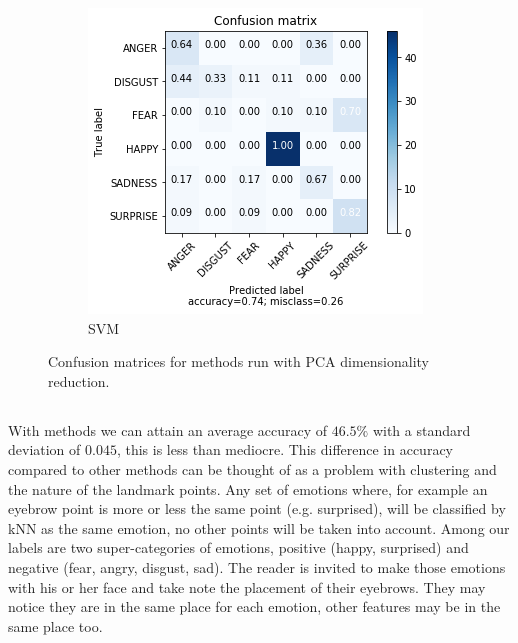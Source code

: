 \begin{figure}
    \begin{subfigure}[b]{0.24\textwidth}
        \includegraphics[width=\textwidth]{figures/pca-svm.png}
        \caption{SVM}
        \label{fig:pca-svm}
    \end{subfigure}
    \caption{Confusion matrices for methods run with PCA dimensionality reduction.}\label{fig:results}
\end{figure}

\subsection{\knn}

With \knn methods we can attain an average accuracy of $46.5\%$ with a standard deviation of $0.045$, this is less than mediocre. This difference in accuracy compared to other methods can be thought of as a problem with clustering and the nature of the landmark points. Any set of emotions where, for example an eyebrow point is more or less the same point (e.g. surprised), will be classified by kNN as the same emotion, no other points will be taken into account. Among our labels are two super-categories of emotions, positive (happy, surprised) and negative (fear, angry, disgust, sad). The reader is invited to make those emotions with his or her face and take note the placement of their eyebrows. They may notice they are in the same place for each emotion, other features may be in the same place too.

